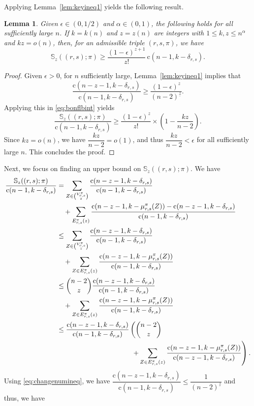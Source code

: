 \documentclass{amsart}
\newtheorem{lem}[thm]{Lemma}
\newcommand{\bb}{\mathbb}
\newcommand{\st}{\mathrm{c}}
\newcommand{\ff}[1]{^{\underline{#1}}}
\begin{document}
Applying Lemma~\ref{lem:keyineq1} yields the following result.
\begin{lem}\label{lem:bonflb}
Given $\epsilon\in(0,1/2)$ and $\alpha\in(0,1)$, the following holds
for all sufficiently large $n$. If $k=k(n)$ and $z=z(n)$ are integers
with $1\leq k,z\leq n^\alpha$ and $kz=o(n)$, then, for an admissible
triple $(r,s,\pi)$, we have
\[
\bb{S}_{z}((r,s);\pi)
\geq
\frac{(1-\epsilon)^{z+1}}{z!}\,
\st(n-1,k-\delta_{r,s}).
\]
\end{lem}
\begin{proof}
Given $\epsilon>0$, for $n$ sufficiently large, Lemma~\ref{lem:keyineq1} implies that \[\dfrac{{\st(n-z-1,k-\delta_{r,s})}}{{\st(n-1,k-\delta_{r,s})}} \geq \dfrac{(1-\epsilon)^{z}}{(n-2)\ff{z}}.\] Applying this in \eqref{eq:bonflbint} yields 
\[\dfrac{\bb{S}_{z}((r,s);\pi)}{\st(n-1,k-\delta_{r,s})} \geq \dfrac{(1-\epsilon)^{z}}{z!} \times (1-\dfrac{kz}{n-2}).\] 
Since $kz=o(n)$, we have $\dfrac{kz}{n-2}=o(1)$, and thus $\dfrac{kz}{n-2}<\epsilon$ for all sufficiently large $n$. This concludes the proof. 
\end{proof}
Next, we focus on finding an upper bound on $\bb{S}_{z}((r,s); \pi)$. We have
\begin{align*}
\dfrac{\bb{S}_{z}((r,s);\pi)}{\st(n-1,k-\delta_{r,s})}
& = \sum\limits_{Z \in \binom{V_{r,s}^{\pi}}{z}}\dfrac{\st(n-z-1,k-\delta_{r,s})}{\st(n-1,k-\delta_{r,s})}\\& \quad + \sum\limits_{E_{r,s}^{\pi}(z)} \dfrac{\st(n-z-1,k-\mu_{r,s}^{\pi}(Z)) - \st(n-z-1,k-\delta_{r,s}) }{\st(n-1,k-\delta_{r,s})} \\
&\leq \sum\limits_{Z \in \binom{V_{r,s}^{\pi}}{z}}\dfrac{\st(n-z-1,k-\delta_{r,s})}{\st(n-1,k-\delta_{r,s})} \\ & \quad + \sum\limits_{Z \in E_{r,s}^{\pi}(z)}\dfrac{\st(n-z-1,k-\mu_{r,s}^{\pi}(Z))}{\st(n-1,k-\delta_{r,s})} \\
&\leq \binom{n-2}{z} \dfrac{\st(n-z-1,k-\delta_{r,s})}{\st(n-1,k-\delta_{r,s})}\\&\quad + \sum\limits_{Z \in E_{r,s}^{\pi}(z)}\dfrac{\st(n-z-1,k-\mu_{r,s}^{\pi}(Z))}{\st(n-1,k-\delta_{r,s})}\\
&\leq \dfrac{\st(n-z-1,k-\delta_{r,s})}{\st(n-1,k-\delta_{r,s})} \left(\binom{n-2}{z} \right.\\ & \left. \hspace{1.5in} + \sum\limits_{Z \in E_{r,s}^{\pi}(z)}\dfrac{\st(n-z-1,k-\mu_{r,s}^{\pi}(Z))}{\st(n-z-1,k-\delta_{r,s})} \right).
\end{align*} 
Using \eqref{eq:changenumineq}, we have $\dfrac{\st(n-z-1,k-\delta_{r,s})}{\st(n-1,k-\delta_{r,s})} \leq \dfrac{1}{(n-2)\ff{z}}$ and thus, we have
\end{document}
